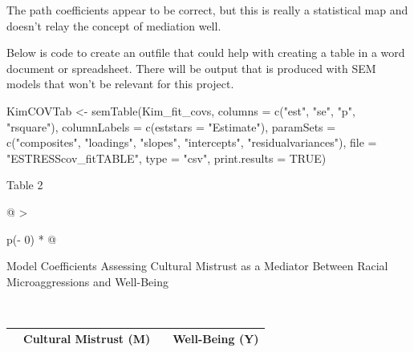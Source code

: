 \documentclass[
  11pt,
]{book}
\newenvironment{Shaded}{\begin{snugshade}}{\end{snugshade}}
\newcommand{\AttributeTok}[1]{\textcolor[rgb]{0.77,0.63,0.00}{#1}}
\newcommand{\ConstantTok}[1]{\textcolor[rgb]{0.00,0.00,0.00}{#1}}
\newcommand{\FunctionTok}[1]{\textcolor[rgb]{0.00,0.00,0.00}{#1}}
\newcommand{\NormalTok}[1]{#1}
\newcommand{\OtherTok}[1]{\textcolor[rgb]{0.56,0.35,0.01}{#1}}
\newcommand{\StringTok}[1]{\textcolor[rgb]{0.31,0.60,0.02}{#1}}
\begin{document}
The path coefficients appear to be correct, but this is really a statistical map and doesn't relay the concept of mediation well.

Below is code to create an outfile that could help with creating a table in a word document or spreadsheet. There will be output that is produced with SEM models that won't be relevant for this project.

\begin{Shaded}
\begin{Highlighting}[]
\NormalTok{KimCOVTab }\OtherTok{\textless{}{-}} \FunctionTok{semTable}\NormalTok{(Kim\_fit\_covs, }\AttributeTok{columns =} \FunctionTok{c}\NormalTok{(}\StringTok{"est"}\NormalTok{, }\StringTok{"se"}\NormalTok{, }\StringTok{"p"}\NormalTok{, }\StringTok{"rsquare"}\NormalTok{),  }\AttributeTok{columnLabels =} \FunctionTok{c}\NormalTok{(}\AttributeTok{eststars =} \StringTok{"Estimate"}\NormalTok{), }\AttributeTok{paramSets =} \FunctionTok{c}\NormalTok{(}\StringTok{"composites"}\NormalTok{, }\StringTok{"loadings"}\NormalTok{, }\StringTok{"slopes"}\NormalTok{, }\StringTok{"intercepts"}\NormalTok{, }\StringTok{"residualvariances"}\NormalTok{), }\AttributeTok{file =} \StringTok{"ESTRESScov\_fitTABLE"}\NormalTok{, }\AttributeTok{type =} \StringTok{"csv"}\NormalTok{, }\AttributeTok{print.results =} \ConstantTok{TRUE}\NormalTok{)}
\end{Highlighting}
\end{Shaded}

Table 2

\begin{longtable}[]{@{}
  >{\raggedright\arraybackslash}p{(\columnwidth - 0\tabcolsep) * }@{}}
\toprule
\begin{minipage}[b]{\linewidth}\raggedright
Model Coefficients Assessing Cultural Mistrust as a Mediator Between Racial Microaggressions and Well-Being
\end{minipage} \\
\midrule
\endhead
\bottomrule
\end{longtable}

\begin{longtable}[]{@{}
  >{\raggedright\arraybackslash}p{}
  >{\centering\arraybackslash}p{}
  >{\centering\arraybackslash}p{}
  >{\centering\arraybackslash}p{}@{}}
\toprule
\endhead
& Cultural Mistrust (M) & & Well-Being (Y) \\
\bottomrule
\end{longtable}
\end{document}
